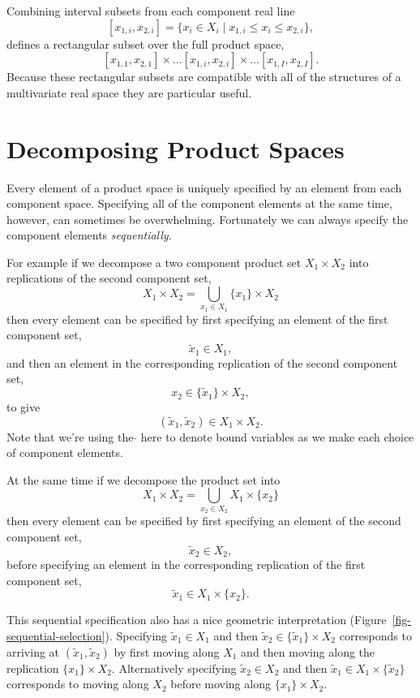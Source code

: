 \documentclass[
  letterpaper,
  DIV=11,
  numbers=noendperiod]{scrartcl}
\begin{document}
Combining interval subsets from each component real line \[
[ x_{1, i}, x_{2, i} ] = 
\{ x_{i} \in X_{i} \mid x_{1, i} \le x_{i} \le x_{2, i} \},
\] defines a rectangular subset over the full product space, \[
[ x_{1, 1}, x_{2, 1} ] \times \ldots
[ x_{1, i}, x_{2, i} ] \times \ldots
[ x_{1, I}, x_{2, I} ].
\] Because these rectangular subsets are compatible with all of the
structures of a multivariate real space they are particular useful.

\hypertarget{sec:decomposition}{%
\section{Decomposing Product Spaces}\label{sec:decomposition}}

Every element of a product space is uniquely specified by an element
from each component space. Specifying all of the component elements at
the same time, however, can sometimes be overwhelming. Fortunately we
can always specify the component elements \emph{sequentially}.

For example if we decompose a two component product set
\(X_{1} \times X_{2}\) into replications of the second component set, \[
X_{1} \times X_{2} = \bigcup_{x_{1} \in X_{1} } \{ x_{1} \} \times X_{2}
\] then every element can be specified by first specifying an element of
the first component set, \[
\tilde{x}_{1} \in X_{1},
\] and then an element in the corresponding replication of the second
component set, \[
x_{2} \in \{ \tilde{x}_{1} \} \times X_{2},
\] to give \[
(\tilde{x}_{1}, \tilde{x}_{2}) \in X_{1} \times X_{2}.
\] Note that we're using the \(\tilde{}\) here to denote bound variables
as we make each choice of component elements.

At the same time if we decompose the product set into \[
X_{1} \times X_{2} = \bigcup_{x_{2} \in X_{2} } X_{1} \times \{ x_{2} \}
\] then every element can be specified by first specifying an element of
the second component set, \[
\tilde{x}_{2} \in X_{2},
\] before specifying an element in the corresponding replication of the
first component set, \[
\tilde{x}_{1} \in X_{1} \times \{ x_{2} \}.
\]

This sequential specification also has a nice geometric interpretation
(Figure~\ref{fig-sequential-selection}). Specifying
\(\tilde{x}_{1} \in X_{1}\) and then
\(\tilde{x}_{2} \in \{ \tilde{x}_{1} \} \times X_{2}\) corresponds to
arriving at \((\tilde{x}_{1}, \tilde{x}_{2})\) by first moving along
\(X_{1}\) and then moving along the replication
\(\{ x_{1} \} \times X_{2}\). Alternatively specifying
\(\tilde{x}_{2} \in X_{2}\) and then
\(\tilde{x}_{1} \in X_{1} \times \{ \tilde{x}_{2} \}\) corresponds to
moving along \(X_{2}\) before moving along \(\{ x_{1} \} \times X_{2}\).
\end{document}

